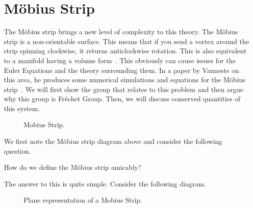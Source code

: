
\section{M\"{o}bius Strip}

The M\"obius strip brings a new level of complexity to this theory. The M\"obius strip is a non-orientable surface. This means that if you send a vortex around the strip spinning clockwise, it returns anticlockwise rotation. This is also equivalent to a manifold having a volume form~\cite{Tu}. This obviously can cause issues for the Euler Equations and the theory surrounding them. In a paper by Vanneste on this area, he produces some numerical simulations and equations for the M\"obius strip~\cite{vanneste_2021}. We will first show the group that relates to this problem and then argue why this group is Fr\'echet Group. Then, we will discuss conserved quantities of this system.

\begin{figure}[!ht]
\centering
\resizebox{0.45\textwidth}{!}{}
\caption{Mobius Strip.}
\label{fig:mobius}
\end{figure}

\noindent
We first note the M\"obius strip diagram above and consider the following question.
\begin{question}
  How do we define the M\"obius strip amicably?
\end{question}
\noindent
The answer to this is quite simple. Consider the following diagram.

\begin{figure}[!ht]
\centering
\resizebox{0.35\textwidth}{!}{}
\caption{Plane representation of a Mobius Strip.}
\label{fig:mobius}
\end{figure}

